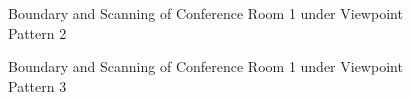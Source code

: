\documentclass[11pt, a4paper,oneside,chapterprefix=false]{scrbook}
\begin{document}
\begin{figure}[H]
    \centering
      \label{fig:conf1 b 1} \hfill
     \label{fig:conf1 s 1}
    \caption{Boundary and Scanning of Conference Room 1 under Viewpoint Pattern 2}
    \label{fig:conf1 1}
\end{figure}

\begin{figure}[H]
    \centering
      \label{fig:conf1 b 2} \hfill
     \label{fig:conf1 s 2}
    \caption{Boundary and Scanning of Conference Room 1 under Viewpoint Pattern 3}
    \label{fig:conf1 2}
\end{figure}
\end{document}
